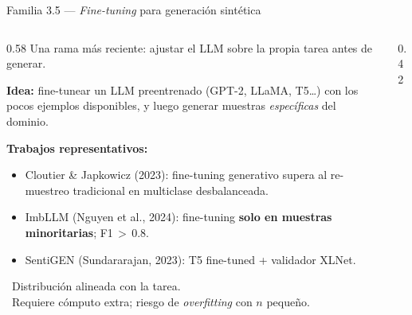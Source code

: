 \iffalse
\begin{frame}{Familia 3.5 — \textit{Fine-tuning} para generación sintética}
\begin{columns}[T]

\begin{column}{0.58\textwidth}
\small
Una rama más reciente: \alert{ajustar el LLM} sobre la propia tarea antes de generar.

\vspace{0.2em}
\textbf{Idea:} fine-tunear un LLM preentrenado (GPT-2, LLaMA, T5\dots) con los pocos ejemplos disponibles, y luego generar muestras \emph{específicas} del dominio.

\vspace{0.3em}
\textbf{Trabajos representativos:}
\begin{itemize}\setlength\itemsep{0pt}\scriptsize
  \item Cloutier \& Japkowicz (2023): \alert{fine-tuning generativo} supera al re-muestreo tradicional en multiclase desbalanceada.
  \item ImbLLM (Nguyen et al., 2024): fine-tuning \textbf{solo en muestras minoritarias}; F1\,$>$\,0.8.
  \item SentiGEN (Sundararajan, 2023): T5 fine-tuned + validador XLNet.
\end{itemize}

\vspace{0.3em}
{\scriptsize
\good\ Distribución alineada con la tarea.\\
\bad\ Requiere \alert{cómputo extra}; riesgo de \emph{overfitting} con $n$ pequeño.}
\end{column}

\begin{column}{0.42\textwidth}
\centering
\vspace{0.1em}
\end{column}
\end{columns}
\end{frame}
